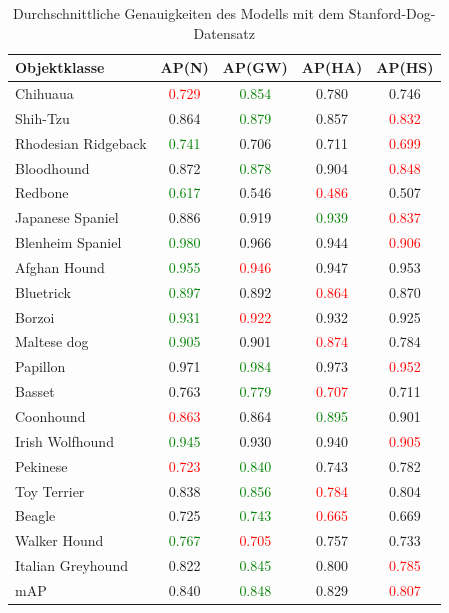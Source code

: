 \begin{table}
[h]
\caption{Durchschnittliche Genauigkeiten des Modells mit dem Stanford-Dog-Datensatz}
\centering
\begin{tabular}{|l|c|c|c|c|}
\hline
Objektklasse & AP(N) & AP(GW) & AP(HA) & AP(HS)\\
\hline
Chihuaua & \textcolor{red}{0.729} & \textcolor{green}{0.854} & 0.780 & 0.746\\ 
Shih-Tzu & 0.864 & \textcolor{green}{0.879} & 0.857 & \textcolor{red}{0.832}\\
Rhodesian Ridgeback & \textcolor{green}{0.741} & 0.706 & 0.711 & \textcolor{red}{0.699}\\
Bloodhound & 0.872 & \textcolor{green}{0.878} & 0.904 & \textcolor{red}{0.848}\\
Redbone & \textcolor{green}{0.617} & 0.546 & \textcolor{red}{0.486} & 0.507\\ 
Japanese Spaniel & 0.886 & 0.919 & \textcolor{green}{0.939} & \textcolor{red}{0.837}\\
Blenheim Spaniel & \textcolor{green}{0.980} & 0.966 & 0.944 & \textcolor{red}{0.906}\\
Afghan Hound & \textcolor{green}{0.955} & \textcolor{red}{0.946} & 0.947 & 0.953\\
Bluetrick & \textcolor{green}{0.897} & 0.892 & \textcolor{red}{0.864} & 0.870\\ 
Borzoi & \textcolor{green}{0.931} & \textcolor{red}{0.922} & 0.932 & 0.925\\
Maltese dog & \textcolor{green}{0.905} & 0.901 & \textcolor{red}{0.874} & 0.784\\
Papillon & 0.971 & \textcolor{green}{0.984} & 0.973 & \textcolor{red}{0.952}\\
Basset & 0.763 & \textcolor{green}{0.779} & \textcolor{red}{0.707} & 0.711\\
Coonhound & \textcolor{red}{0.863} & 0.864 & \textcolor{green}{0.895} & 0.901\\
Irish Wolfhound & \textcolor{green}{0.945} & 0.930 & 0.940 & \textcolor{red}{0.905}\\
Pekinese & \textcolor{red}{0.723} & \textcolor{green}{0.840} & 0.743 & 0.782\\
Toy Terrier & 0.838 & \textcolor{green}{0.856} & \textcolor{red}{0.784} & 0.804\\
Beagle & 0.725 & \textcolor{green}{0.743} & \textcolor{red}{0.665} & 0.669\\
Walker Hound & \textcolor{green}{0.767} & \textcolor{red}{0.705} & 0.757 & 0.733\\
Italian Greyhound & 0.822 & \textcolor{green}{0.845} & 0.800 & \textcolor{red}{0.785}\\
\hline
mAP & 0.840 & \textcolor{green}{0.848} & 0.829 & \textcolor{red}{0.807}\\
\hline
\end{tabular}
\end{table}
